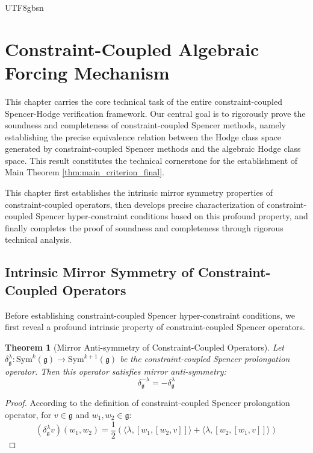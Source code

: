 \documentclass[a4paper,12pt]{extarticle}
\newtheorem{theorem}{Theorem}[section]
\theoremstyle{definition}
\begin{document}
\begin{CJK}{UTF8}{gbsn}
\section{Constraint-Coupled Algebraic Forcing Mechanism}
\label{sec:algebraic_forcing_mechanism}

This chapter carries the core technical task of the entire constraint-coupled Spencer-Hodge verification framework. Our central goal is to rigorously prove the soundness and completeness of constraint-coupled Spencer methods, namely establishing the precise equivalence relation between the Hodge class space generated by constraint-coupled Spencer methods and the algebraic Hodge class space. This result constitutes the technical cornerstone for the establishment of Main Theorem \ref{thm:main_criterion_final}.

This chapter first establishes the intrinsic mirror symmetry properties of constraint-coupled operators, then develops precise characterization of constraint-coupled Spencer hyper-constraint conditions based on this profound property, and finally completes the proof of soundness and completeness through rigorous technical analysis.

\subsection{Intrinsic Mirror Symmetry of Constraint-Coupled Operators}
\label{subsec:intrinsic_mirror_symmetry}

Before establishing constraint-coupled Spencer hyper-constraint conditions, we first reveal a profound intrinsic property of constraint-coupled Spencer operators.

\begin{theorem}[Mirror Anti-symmetry of Constraint-Coupled Operators]
\label{thm:constraint_coupled_mirror_antisymmetry}
Let $\delta^\lambda_\mathfrak{g}: \text{Sym}^k(\mathfrak{g}) \to \text{Sym}^{k+1}(\mathfrak{g})$ be the constraint-coupled Spencer prolongation operator. Then this operator satisfies mirror anti-symmetry:
\begin{equation}
\label{eq:mirror_antisymmetry}
\delta^{-\lambda}_\mathfrak{g} = -\delta^\lambda_\mathfrak{g}
\end{equation}
\end{theorem}

\begin{proof}
According to the definition of constraint-coupled Spencer prolongation operator, for $v \in \mathfrak{g}$ and $w_1, w_2 \in \mathfrak{g}$:
\begin{equation}
\label{eq:constraint_spencer_operator_definition}
(\delta^\lambda_\mathfrak{g}v)(w_1, w_2) = \frac{1}{2}\left(\langle \lambda, [w_1, [w_2, v]]\rangle + \langle \lambda, [w_2, [w_1, v]]\rangle\right)
\end{equation}


\end{proof}
\end{CJK}
\end{document}
